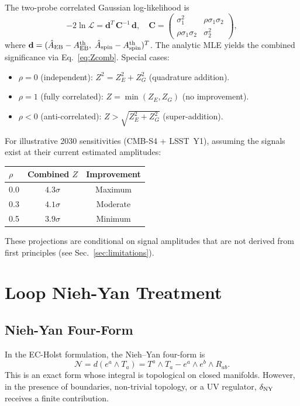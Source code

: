 \documentclass[aps,prd,twocolumn,superscriptaddress,showpacs,preprintnumbers,nofootinbib,longbibliography,floatfix]{revtex4-2}
\begin{document}
The two-probe correlated Gaussian log-likelihood is
\begin{equation}\label{eq:joint}
-2\ln\mathcal{L}=\mathbf{d}^T\,\mathbf{C}^{-1}\,\mathbf{d},\quad \mathbf{C}=\begin{pmatrix}\sigma_1^2 & \rho\sigma_1\sigma_2 \\ \rho\sigma_1\sigma_2 & \sigma_2^2\end{pmatrix},
\end{equation}
where $\mathbf{d}=(\hat{A}_{\rm EB}-A_{\rm EB}^{\rm th},\;\hat{A}_{\rm spin}-A_{\rm spin}^{\rm th})^T$. The analytic MLE yields the combined significance via Eq.~\eqref{eq:Zcomb}. Special cases:
\begin{itemize}[leftmargin=*]
\item $\rho = 0$ (independent): $Z^2 = Z_E^2 + Z_G^2$ (quadrature addition).
\item $\rho = 1$ (fully correlated): $Z = \min(Z_E, Z_G)$ (no improvement).
\item $\rho < 0$ (anti-correlated): $Z > \sqrt{Z_E^2 + Z_G^2}$ (super-addition).
\end{itemize}

For illustrative 2030 sensitivities (CMB-S4 + LSST~Y1), assuming the signals exist at their current estimated amplitudes:
\begin{center}
\begin{tabular}{lcc}
$\rho$ & Combined $Z$ & Improvement \\
\hline
0.0 & $4.3\sigma$ & Maximum \\
0.3 & $4.1\sigma$ & Moderate \\
0.5 & $3.9\sigma$ & Minimum \\
\end{tabular}
\end{center}
These projections are conditional on signal amplitudes that are not derived from first principles (see Sec.~\ref{sec:limitations}).


\section{Loop Nieh-Yan Treatment}\label{app:niehyan}

\subsection{Nieh-Yan Four-Form}

In the EC-Holst formulation, the Nieh--Yan four-form is
\begin{equation}
\mathcal{N}=d(e^a\wedge T_a)=T^a\wedge T_a - e^a\wedge e^b\wedge R_{ab}.
\end{equation}
This is an exact form whose integral is topological on closed manifolds. However, in the presence of boundaries, non-trivial topology, or a UV regulator, $\delta_{\rm NY}$ receives a finite contribution.
\end{document}
